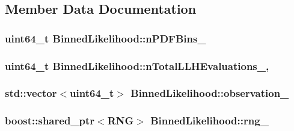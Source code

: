 \subsection{Member Data Documentation}
\hypertarget{classBinnedLikelihood_af657060cd01071e78f96e272ff3afb2c}{
\subsubsection[{n\-P\-D\-F\-Bins\-\_\-}]{\setlength{\rightskip}{0pt plus 5cm}uint64\-\_\-t Binned\-Likelihood\-::n\-P\-D\-F\-Bins\-\_\-\hspace{0.3cm}{\ttfamily [protected]}}}\label{classBinnedLikelihood_af657060cd01071e78f96e272ff3afb2c}
\hypertarget{classBinnedLikelihood_ad5b5a1f9f9a1db6779f3d82c25b7b0b3}{
\subsubsection[{n\-Total\-L\-L\-H\-Evaluations\-\_\-}]{\setlength{\rightskip}{0pt plus 5cm}uint64\-\_\-t Binned\-Likelihood\-::n\-Total\-L\-L\-H\-Evaluations\-\_\-\hspace{0.3cm}{\ttfamily [mutable]}, {\ttfamily [protected]}}}\label{classBinnedLikelihood_ad5b5a1f9f9a1db6779f3d82c25b7b0b3}
\hypertarget{classBinnedLikelihood_aa5b023123bb5a1ce1fdd5351ed5e08d2}{
\subsubsection[{observation\-\_\-}]{\setlength{\rightskip}{0pt plus 5cm}std\-::vector$<$uint64\-\_\-t$>$ Binned\-Likelihood\-::observation\-\_\-\hspace{0.3cm}{\ttfamily [protected]}}}\label{classBinnedLikelihood_aa5b023123bb5a1ce1fdd5351ed5e08d2}
\hypertarget{classBinnedLikelihood_a6a3e39234f7cb8a1a28df28204884632}{
\subsubsection[{rng\-\_\-}]{\setlength{\rightskip}{0pt plus 5cm}boost\-::shared\-\_\-ptr$<${\bf R\-N\-G}$>$ Binned\-Likelihood\-::rng\-\_\-\hspace{0.3cm}{\ttfamily [protected]}}}\label{classBinnedLikelihood_a6a3e39234f7cb8a1a28df28204884632}
